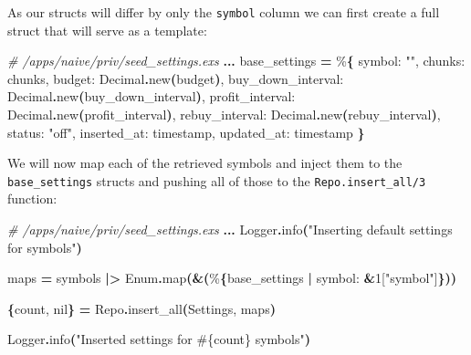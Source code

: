 \documentclass[
  oneside]{book}
\newenvironment{Shaded}{\begin{snugshade}}{\end{snugshade}}
\newcommand{\CommentTok}[1]{\textcolor[rgb]{0.56,0.35,0.01}{\textit{#1}}}
\newcommand{\ConstantTok}[1]{\textcolor[rgb]{0.56,0.35,0.01}{#1}}
\newcommand{\DecValTok}[1]{\textcolor[rgb]{0.00,0.00,0.81}{#1}}
\newcommand{\FunctionTok}[1]{\textcolor[rgb]{0.13,0.29,0.53}{\textbf{#1}}}
\newcommand{\NormalTok}[1]{#1}
\newcommand{\OperatorTok}[1]{\textcolor[rgb]{0.81,0.36,0.00}{\textbf{#1}}}
\newcommand{\OtherTok}[1]{\textcolor[rgb]{0.56,0.35,0.01}{#1}}
\newcommand{\StringTok}[1]{\textcolor[rgb]{0.31,0.60,0.02}{#1}}
\newcommand{\VariableTok}[1]{\textcolor[rgb]{0.00,0.00,0.00}{#1}}
\begin{document}
As our structs will differ by only the \texttt{symbol} column we can first create a full struct that will serve as a template:

\begin{Shaded}
\begin{Highlighting}[]
\CommentTok{\# /apps/naive/priv/seed\_settings.exs}
\OperatorTok{...}
\NormalTok{base\_settings }\OperatorTok{=}\NormalTok{ \%}\FunctionTok{\{}
  \VariableTok{symbol:} \StringTok{""}\NormalTok{,}
  \VariableTok{chunks:}\NormalTok{ chunks,}
  \VariableTok{budget:} \ConstantTok{Decimal}\OperatorTok{.}\NormalTok{new}\FunctionTok{(}\NormalTok{budget}\FunctionTok{)}\NormalTok{,}
  \VariableTok{buy\_down\_interval:} \ConstantTok{Decimal}\OperatorTok{.}\NormalTok{new}\FunctionTok{(}\NormalTok{buy\_down\_interval}\FunctionTok{)}\NormalTok{,}
  \VariableTok{profit\_interval:} \ConstantTok{Decimal}\OperatorTok{.}\NormalTok{new}\FunctionTok{(}\NormalTok{profit\_interval}\FunctionTok{)}\NormalTok{,}
  \VariableTok{rebuy\_interval:} \ConstantTok{Decimal}\OperatorTok{.}\NormalTok{new}\FunctionTok{(}\NormalTok{rebuy\_interval}\FunctionTok{)}\NormalTok{,}
  \VariableTok{status:} \StringTok{"off"}\NormalTok{,}
  \VariableTok{inserted\_at:}\NormalTok{ timestamp,}
  \VariableTok{updated\_at:}\NormalTok{ timestamp}
\FunctionTok{\}}
\end{Highlighting}
\end{Shaded}

We will now map each of the retrieved symbols and inject them to the \texttt{base\_settings} structs and pushing all of those to the \texttt{Repo.insert\_all/3} function:

\begin{Shaded}
\begin{Highlighting}[]
\CommentTok{\# /apps/naive/priv/seed\_settings.exs}
\OperatorTok{...}
\ConstantTok{Logger}\OperatorTok{.}\NormalTok{info}\FunctionTok{(}\StringTok{"Inserting default settings for symbols"}\FunctionTok{)}

\NormalTok{maps }\OperatorTok{=}\NormalTok{ symbols}
  \OperatorTok{|\textgreater{}} \ConstantTok{Enum}\OperatorTok{.}\NormalTok{map}\FunctionTok{(}\OperatorTok{\&}\FunctionTok{(}\NormalTok{\%}\FunctionTok{\{}\NormalTok{base\_settings }\OperatorTok{|} \VariableTok{symbol:} \OperatorTok{\&}\DecValTok{1}\OtherTok{[}\StringTok{"symbol"}\OtherTok{]}\FunctionTok{\}))}

\FunctionTok{\{}\NormalTok{count, }\ConstantTok{nil}\FunctionTok{\}} \OperatorTok{=} \ConstantTok{Repo}\OperatorTok{.}\NormalTok{insert\_all}\FunctionTok{(}\ConstantTok{Settings}\NormalTok{, maps}\FunctionTok{)}

\ConstantTok{Logger}\OperatorTok{.}\NormalTok{info}\FunctionTok{(}\StringTok{"Inserted settings for }\OtherTok{\#\{}\NormalTok{count}\OtherTok{\}}\StringTok{ symbols"}\FunctionTok{)}
\end{Highlighting}
\end{Shaded}
\end{document}
